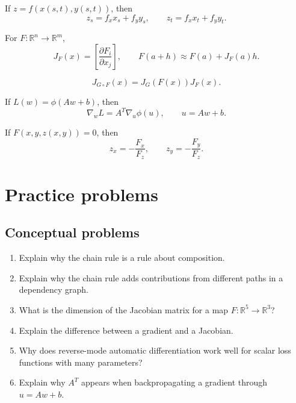 \documentclass[11pt]{article}
\newcommand{\R}{\mathbb R}
\newcommand{\grad}{\nabla}
\begin{document}
\begin{formulabox}
If $z=f(x(s,t),y(s,t))$, then
\[
z_s=f_xx_s+f_yy_s,
\qquad
z_t=f_xx_t+f_yy_t.
\]
\end{formulabox}

\begin{formulabox}
For $F:\R^n\to\R^m$,
\[
J_F(x)=\left[\frac{\partial F_i}{\partial x_j}\right],
\qquad
F(a+h)\approx F(a)+J_F(a)h.
\]
\end{formulabox}

\begin{formulabox}
\[
J_{G\circ F}(x)=J_G(F(x))J_F(x).
\]
\end{formulabox}

\begin{formulabox}
If $L(w)=\phi(Aw+b)$, then
\[
\grad_w L=A^T\grad_u\phi(u),\qquad u=Aw+b.
\]
\end{formulabox}

\begin{formulabox}
If $F(x,y,z(x,y))=0$, then
\[
z_x=-\frac{F_x}{F_z},
\qquad
z_y=-\frac{F_y}{F_z}.
\]
\end{formulabox}

\section{Practice problems}

\subsection*{Conceptual problems}
\begin{enumerate}
  \item Explain why the chain rule is a rule about composition.
  \item Explain why the chain rule adds contributions from different paths in a dependency graph.
  \item What is the dimension of the Jacobian matrix for a map $F:\R^5\to\R^3$?
  \item Explain the difference between a gradient and a Jacobian.
  \item Why does reverse-mode automatic differentiation work well for scalar loss functions with many parameters?
  \item Explain why $A^T$ appears when backpropagating a gradient through $u=Aw+b$.
\end{enumerate}
\end{document}
